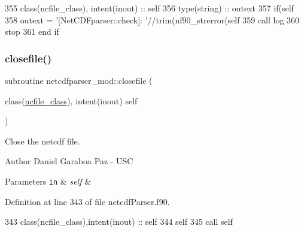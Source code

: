 \begin{DoxyCode}
355     \textcolor{keywordtype}{class}(ncfile\_class), \textcolor{keywordtype}{intent(inout)} :: self
356     \textcolor{keywordtype}{type}(string) :: outext
357     \textcolor{keywordflow}{if}(self%
358         outext = \textcolor{stringliteral}{'[NetCDFparser::check]: '}//trim(nf90\_strerror(self%
359         \textcolor{keyword}{call }log%
360         stop
361 \textcolor{keywordflow}{    end if}
\end{DoxyCode}
\mbox{\label{namespacenetcdfparser__mod_a518627511cac4bf3dbc338bf3bfd5e24}} 
\subsubsection{\texorpdfstring{closefile()}{closefile()}}
{\footnotesize\ttfamily subroutine netcdfparser\+\_\+mod\+::closefile (\begin{DoxyParamCaption}\item[{class(\mbox{\hyperlink{structnetcdfparser__mod_1_1ncfile__class}{ncfile\+\_\+class}}), intent(inout)}]{self }\end{DoxyParamCaption})\hspace{0.3cm}{\ttfamily [private]}}



Close the netcdf file. 

\begin{DoxyAuthor}{Author}
Daniel Garaboa Paz -\/ U\+SC 
\end{DoxyAuthor}

\begin{DoxyParams}[1]{Parameters}
\mbox{\tt in}  & {\em self} & \\
\hline
\end{DoxyParams}


Definition at line 343 of file netcdf\+Parser.\+f90.


\begin{DoxyCode}
343     \textcolor{keywordtype}{class}(ncfile\_class),\textcolor{keywordtype}{intent(inout)} :: self
344     self%
345     \textcolor{keyword}{call }self%
\end{DoxyCode}
\mbox{\label{namespacenetcdfparser__mod_af93319fde6cf6baedb7fe27bf3396e7b}} 
